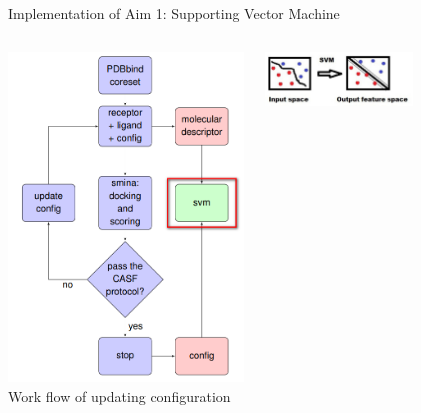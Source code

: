 \begin{frame}{Implementation of Aim 1: Supporting Vector Machine}
   \begin{columns}
          \begin{column}{0.4\textwidth}
        \includegraphics[height=0.8\textheight]{../figures/method_svm.png}\\
      {\scriptsize Work flow of updating configuration}
    \end{column}
    \begin{column}{0.55\textwidth}
              \centering
    \includegraphics[width=0.6\textwidth]{../figures/concept_svm.png}\\

\end{column}
\end{columns}
\end{frame}

